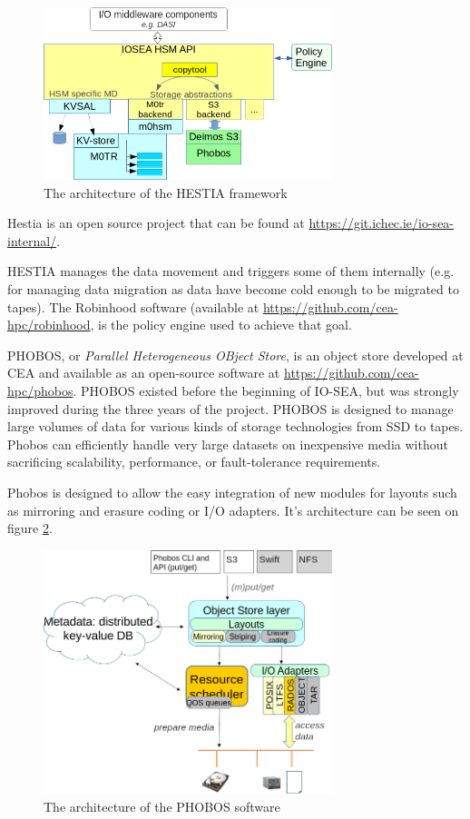 \begin{figure}[H]
    \centering
    \includegraphics[width=0.75\textwidth]{FIGS/hestia.png}
    \caption[HESTIA software architecture]{ The architecture of the HESTIA framework}
    \label{fig:hestia}
\end{figure}

Hestia is an open source project that can be found at \url{https://git.ichec.ie/io-sea-internal/}.

HESTIA manages the data movement and triggers some of them internally (e.g. for managing data migration as data
have become cold enough to be migrated to tapes). The Robinhood software (available at
\url{https://github.com/cea-hpc/robinhood}, is the policy engine used to achieve that goal. 

PHOBOS, or \textit{Parallel Heterogeneous OBject Store}, is an object store developed at CEA and available as an
open-source software at \url{https://github.com/cea-hpc/phobos}. PHOBOS existed before the beginning of IO-SEA,
but was strongly improved during the three years of the project. PHOBOS is designed to manage large volumes of
data for various kinds of storage technologies from SSD to tapes. Phobos can efficiently handle very large
datasets on inexpensive media without sacrificing scalability, performance, or fault-tolerance requirements.

Phobos is designed to allow the easy integration of new modules for layouts such as mirroring and erasure coding
or I/O adapters. It's architecture can be seen on figure \ref{fig:phobos}. 

\begin{figure}[H]
    \centering
    \includegraphics[width=0.75\textwidth]{FIGS/phobos.png}
    \caption[PHOBOS architecture]{ The architecture of the PHOBOS software}
    \label{fig:phobos}
\end{figure}

